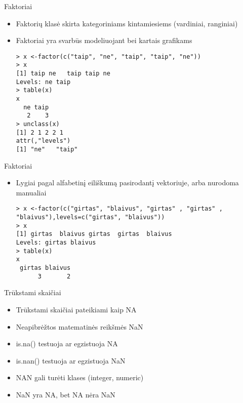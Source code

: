\documentclass[11pt,xcolor=table]{beamer}
\begin{document}

\begin{frame}[fragile]{Faktoriai}
\begin{itemize}
\item Faktorių klasė skirta kategoriniams kintamiesiems (vardiniai, ranginiai)
\item Faktoriai yra svarbūs modeliuojant bei kartais grafikams

\begin{lstlisting}
> x <-factor(c("taip", "ne", "taip", "taip", "ne"))
> x
[1] taip ne   taip taip ne  
Levels: ne taip
> table(x)
x
  ne taip 
   2    3 
> unclass(x)
[1] 2 1 2 2 1
attr(,"levels")
[1] "ne"   "taip"
\end{lstlisting}
\end{itemize}
\end{frame}


\begin{frame}[fragile]{Faktoriai}
\begin{itemize}
\item Lygiai pagal alfabetinį eiliškumą pasirodantį vektoriuje, arba nurodoma manualiai

\begin{lstlisting}
> x <-factor(c("girtas", "blaivus", "girtas" , "girtas" , "blaivus"),levels=c("girtas", "blaivus"))
> x
[1] girtas  blaivus girtas  girtas  blaivus
Levels: girtas blaivus
> table(x)
x
 girtas blaivus 
      3       2  
\end{lstlisting}
\end{itemize}
\end{frame}


\begin{frame}[fragile]{Trūkstami skaičiai}
\begin{itemize}
\item Trūkstami skaičiai pateikiami kaip NA
\item Neapibrėžtos matematinės reikšmės NaN
\item is.na() testuoja ar egzistuoja NA
\item is.nan() testuoja ar egzistuoja NaN
\item NAN gali turėti klases (integer, numeric)
\item NaN yra NA, bet NA nėra NaN
\end{itemize}
\end{frame}
\end{document}
